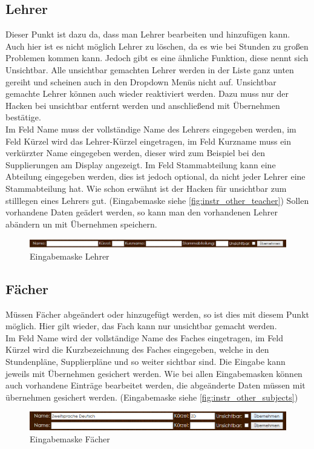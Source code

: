 \subsection{Lehrer}
Dieser Punkt ist dazu da, dass man Lehrer bearbeiten und hinzufügen kann. Auch hier ist es nicht möglich Lehrer zu löschen, da es wie bei Stunden zu großen Problemen kommen kann. Jedoch gibt es eine ähnliche Funktion, diese nennt sich Unsichtbar. Alle unsichtbar gemachten Lehrer werden in der Liste ganz unten gereiht und scheinen auch in den Dropdown Menüs nicht auf. Unsichtbar gemachte Lehrer können auch wieder reaktiviert werden. Dazu muss nur der Hacken bei unsichtbar entfernt werden und anschließend mit Übernehmen bestätige.\\
Im Feld Name muss der vollständige Name des Lehrers eingegeben werden, im Feld Kürzel wird das Lehrer-Kürzel eingetragen, im Feld Kurzname muss ein verkürzter Name eingegeben werden, dieser wird zum Beispiel bei den Supplierungen am Display angezeigt. Im Feld Stammabteilung kann eine Abteilung eingegeben werden, dies ist jedoch optional, da nicht jeder Lehrer eine Stammabteilung hat. Wie schon erwähnt ist der Hacken für unsichtbar zum stilllegen eines Lehrers gut. (Eingabemaske siehe \autoref{fig:instr_other_teacher}) Sollen vorhandene Daten geädert werden, so kann man den vorhandenen Lehrer abändern un mit Übernehmen speichern.
\begin{figure}[H]
\centering
\includegraphics[keepaspectratio=true, width=17cm]{images/screenshots/teachers_input.png}
\caption{Eingabemaske Lehrer}
\label{fig:instr_other_teacher}
\end{figure}
\subsection{Fächer}
Müssen Fächer abgeändert oder hinzugefügt werden, so ist dies mit diesem Punkt möglich. Hier gilt wieder, das Fach kann nur unsichtbar gemacht werden.\\
Im Feld Name wird der vollständige Name des Faches eingetragen, im Feld Kürzel wird die Kurzbezeichnung des Faches eingegeben, welche in den Stundenpläne, Supplierpläne und so weiter sichtbar sind. Die Eingabe kann jeweils mit Übernehmen gesichert werden. Wie bei allen Eingabemasken können auch vorhandene Einträge bearbeitet werden, die abgeänderte Daten müssen mit übernehmen gesichert werden. (Eingabemaske siehe \autoref{fig:instr_other_subjects})
\begin{figure}[H]
\centering
\includegraphics[keepaspectratio=true, width=17cm]{images/screenshots/subjects_input.png}
\caption{Eingabemaske Fächer}
\label{fig:instr_other_subjects}
\end{figure}
